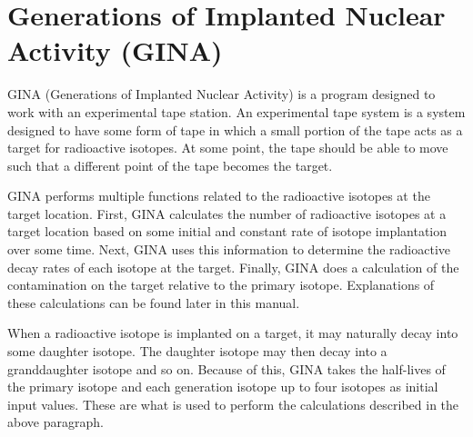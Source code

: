 \chapter{Generations of Implanted Nuclear Activity (GINA)}

GINA (Generations of Implanted Nuclear Activity) is a program designed to work with an experimental tape station. An experimental tape system is a system designed to have some form of tape in which a small portion of the tape acts as a target for radioactive isotopes. At some point, the tape should be able to move such that a different point of the tape becomes the target. 

GINA performs multiple functions related to the radioactive isotopes at the target location. First, GINA calculates the number of radioactive isotopes at a target location based on some initial and constant rate of isotope implantation over some time. Next, GINA uses this information to determine the radioactive decay rates of each isotope at the target. Finally, GINA does a calculation of the contamination on the target relative to the primary isotope. Explanations of these calculations can be found later in this manual.

When a radioactive isotope is implanted on a target, it may naturally decay into some daughter isotope. The daughter isotope may then decay into a granddaughter isotope and so on. Because of this, GINA takes the half-lives of the primary isotope and each generation isotope up to four isotopes as initial input values. These are what is used to perform the calculations described in the above paragraph.

